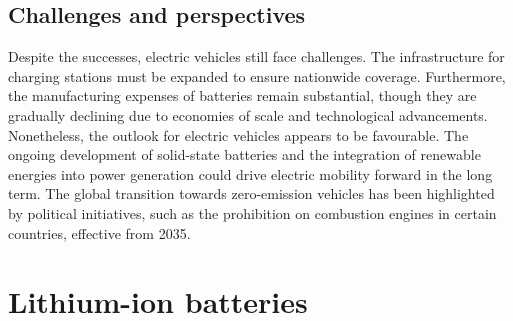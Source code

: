 \subsection*{Challenges and perspectives}
Despite the successes, electric vehicles still face challenges.  The infrastructure for charging stations must be expanded to ensure nationwide coverage.\autocite{statista_ladeinfrastruktur_elektroautos} 
Furthermore, the manufacturing expenses of batteries remain substantial, though they are gradually declining due to economies of scale and technological advancements.\autocite{automobilproduktion_produktionskosten_elektroautos} \newline
Nonetheless, the outlook for electric vehicles appears to be favourable. The ongoing development of solid-state batteries and the integration of renewable energies into power generation could drive electric mobility forward in the long term. The global transition towards zero-emission vehicles has been highlighted by political initiatives, such as the prohibition on combustion engines in certain countries, effective from 2035.\autocite{fraunhofer_batterie_rohstoffe}

\section{Lithium-ion batteries}

